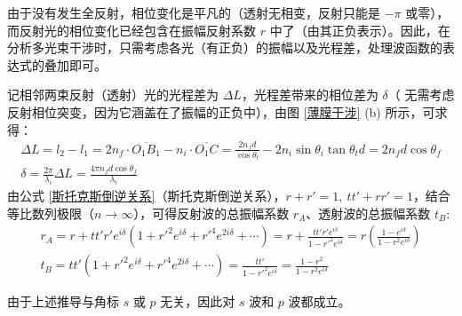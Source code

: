 \documentclass[UTF8]{report}
\theoremstyle{MyLineTheoremStyle} %
\theoremstyle{MyBlockTheoremStyle} %
\theoremstyle{MySubsubsectionStyle} %
\begin{document}
由于没有发生全反射，相位变化是平凡的（透射无相变，反射只能是 $-\pi$ 或零），而反射光的相位变化已经包含在振幅反射系数 $r$ 中了（由其正负表示）。因此，在分析多光束干涉时，只需考虑各光（有正负）的振幅以及光程差，处理波函数的表达式的叠加即可。

记相邻两束反射（透射）光的光程差为 $\Delta L$，光程差带来的相位差为 $\delta$（{\color{red} 无需考虑反射相位突变，因为它涵盖在了振幅的正负中}），由图 \ref{薄膜干涉} (b) 所示，可求得：
\begin{gather}
    \Delta L = l_2 - l_1 = 2 n_f\cdot  \overline{O_1B_1} - n_i\cdot  \overline{O_1 C} = \frac{2 n_f d}{\cos \theta_t} - 2 n_i \sin \theta_i \tan \theta_t d = 2 n_f d \cos \theta_f \\ 
    \delta = \frac{2 \pi}{\lambda_i} \Delta L = \frac{4 \pi n_f d \cos \theta_f}{\lambda_i}
\end{gather}
由公式 \ref{斯托克斯倒逆关系}（斯托克斯倒逆关系），$r + r' = 1,\ tt' + rr' =1$，结合等比数列极限（$n \to \infty$），可得反射波的总振幅系数 $r_A$、透射波的总振幅系数 $t_B$:
\begin{gather}
    r_A 
    = r + tt'r' e^{i \delta}\left( 1 + r'^2e^{i \delta} +  r'^4e^{2 i \delta} + \cdots\right) 
    = r +  \frac{tt'r'e^{i \delta}}{1 - r'^2e^{i \delta}} 
    = r \left( \frac{1 - e^{i \delta}}{1 - r^2 e^{i \delta}} \right)
    \\ 
    t_B 
    =  tt' \left( 1 + r'^2e^{i \delta} +  r'^4e^{2 i \delta} + \cdots \right) = \frac{tt'}{1 - r'^2e^{i \delta}} = \frac{1 - r^2}{1 - r^2 e^{i \delta}}
\end{gather}

由于上述推导与角标 $s$ 或 $p$ 无关，因此对 $s$ 波和 $p$ 波都成立。
\end{document}

